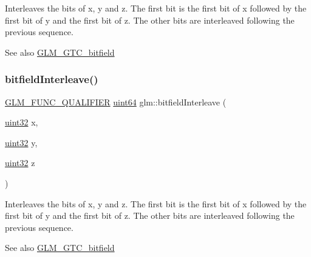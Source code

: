 Interleaves the bits of x, y and z. The first bit is the first bit of x followed by the first bit of y and the first bit of z. The other bits are interleaved following the previous sequence.

\begin{DoxySeeAlso}{See also}
\hyperlink{group__gtc__bitfield}{G\+L\+M\+\_\+\+G\+T\+C\+\_\+bitfield} 
\end{DoxySeeAlso}
\mbox{\label{group__gtc__bitfield_ga7c10eb37f608365cfaef5ca2c476e1ce}} 
\subsubsection{\texorpdfstring{bitfield\+Interleave()}{bitfieldInterleave()}\hspace{0.1cm}{\footnotesize\ttfamily [12/16]}}
{\footnotesize\ttfamily \hyperlink{setup_8hpp_a33fdea6f91c5f834105f7415e2a64407}{G\+L\+M\+\_\+\+F\+U\+N\+C\+\_\+\+Q\+U\+A\+L\+I\+F\+I\+ER} \hyperlink{group__gtc__type__precision_gae3632bf9b37da66233d78930dd06378a}{uint64} glm\+::bitfield\+Interleave (\begin{DoxyParamCaption}\item[{\hyperlink{group__gtc__type__precision_ga202b6a53c105fcb7e531f9b443518451}{uint32}}]{x,  }\item[{\hyperlink{group__gtc__type__precision_ga202b6a53c105fcb7e531f9b443518451}{uint32}}]{y,  }\item[{\hyperlink{group__gtc__type__precision_ga202b6a53c105fcb7e531f9b443518451}{uint32}}]{z }\end{DoxyParamCaption})}

Interleaves the bits of x, y and z. The first bit is the first bit of x followed by the first bit of y and the first bit of z. The other bits are interleaved following the previous sequence.

\begin{DoxySeeAlso}{See also}
\hyperlink{group__gtc__bitfield}{G\+L\+M\+\_\+\+G\+T\+C\+\_\+bitfield} 
\end{DoxySeeAlso}
\mbox{\label{group__gtc__bitfield_ga7da84ecc2b3a46c9c08a9f40012359cf}} 
